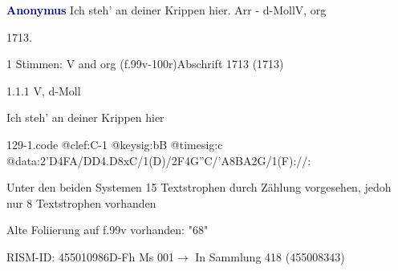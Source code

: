 \documentclass[twocolumn]{book}
\begin{document}
\par \vspace{7pt} \textcolor{darkblue}{\textbf{Anonymus  }}\hfillplus{\textbf{[129]}}\newline Ich steh' an deiner Krippen hier. Arr - d-Moll\newline V, org
\par \begin{itshape} 1713.\end{itshape} 
\par \textcolor{darkblue}{}  1 Stimmen: V and org  (f.99v-100r)\newline Abschrift  1713 (1713)
\par 1.1.1  V, d-Moll\newline \begin{footnotesize} Ich steh' an deiner Krippen hier \end{footnotesize}  
\begin{filecontents*}{129-1.code}
@clef:C-1
@keysig:bB
@timesig:c
@data:2'D4FA/DD4.D8xC/1(D)/2F4G''C/'A{8BA}2G/1(F)://:
\end{filecontents*}
\newline
%
\par Unter den beiden Systemen 15 Textstrophen durch Zählung vorgesehen, jedoh nur 8 Textstrophen vorhanden
\par Alte Foliierung auf f.99v vorhanden: "68"
\par RISM-ID: 455010986\newline D-Fh  Ms 001\newline $\rightarrow$ In Sammlung 418 (455008343)
      
\end{document}
